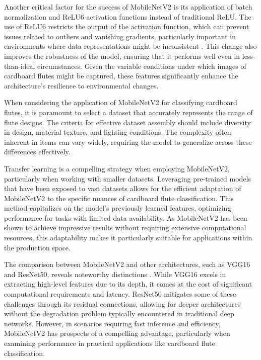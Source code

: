 Another critical factor for the success of MobileNetV2 is its application of batch normalization and ReLU6 activation functions instead of traditional ReLU. The use of ReLU6 restricts the output of the activation function, which can prevent issues related to outliers and vanishing gradients, particularly important in environments where data representations might be inconsistent \cite{He2016}. This change also improves the robustness of the model, ensuring that it performs well even in less-than-ideal circumstances. Given the variable conditions under which images of cardboard flutes might be captured, these features significantly enhance the architecture's resilience to environmental changes.


When considering the application of MobileNetV2 for classifying cardboard flutes, it is paramount to select a dataset that accurately represents the range of flute designs. The criteria for effective dataset assembly should include diversity in design, material texture, and lighting conditions. The complexity often inherent in items can vary widely, requiring the model to generalize across these differences effectively. 


Transfer learning is a compelling strategy when employing MobileNetV2, particularly when working with smaller datasets. Leveraging pre-trained models that have been exposed to vast datasets allows for the efficient adaptation of MobileNetV2 to the specific nuances of cardboard flute classification. This method capitalizes on the model's previously learned features, optimizing performance for tasks with limited data availability. As MobileNetV2 has been shown to achieve impressive results without requiring extensive computational resources, this adaptability makes it particularly suitable for applications within the production space.


The comparison between MobileNetV2 and other architectures, such as VGG16 and ResNet50, reveals noteworthy distinctions \cite{shorten2019survey}. While VGG16 excels in extracting high-level features due to its depth, it comes at the cost of significant computational requirements and latency. ResNet50 mitigates some of these challenges through its residual connections, allowing for deeper architectures without the degradation problem typically encountered in traditional deep networks. However, in scenarios requiring fast inference and efficiency, MobileNetV2 has prospects of a compelling advantage, particularly when examining performance in practical applications like cardboard flute classification.


